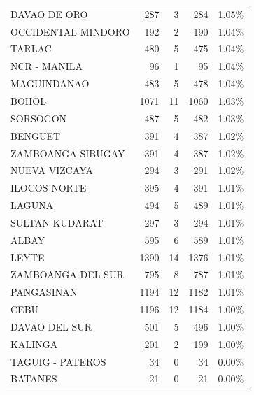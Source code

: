\begin{tabular}{lrrrr}
DAVAO DE ORO & 287 & 3 & 284 & 1.05\% \\
OCCIDENTAL MINDORO & 192 & 2 & 190 & 1.04\% \\
TARLAC & 480 & 5 & 475 & 1.04\% \\
NCR - MANILA & 96 & 1 & 95 & 1.04\% \\
MAGUINDANAO & 483 & 5 & 478 & 1.04\% \\
BOHOL & 1071 & 11 & 1060 & 1.03\% \\
SORSOGON & 487 & 5 & 482 & 1.03\% \\
BENGUET & 391 & 4 & 387 & 1.02\% \\
ZAMBOANGA SIBUGAY & 391 & 4 & 387 & 1.02\% \\
NUEVA VIZCAYA & 294 & 3 & 291 & 1.02\% \\
ILOCOS NORTE & 395 & 4 & 391 & 1.01\% \\
LAGUNA & 494 & 5 & 489 & 1.01\% \\
SULTAN KUDARAT & 297 & 3 & 294 & 1.01\% \\
ALBAY & 595 & 6 & 589 & 1.01\% \\
LEYTE & 1390 & 14 & 1376 & 1.01\% \\
ZAMBOANGA DEL SUR & 795 & 8 & 787 & 1.01\% \\
PANGASINAN & 1194 & 12 & 1182 & 1.01\% \\
CEBU & 1196 & 12 & 1184 & 1.00\% \\
DAVAO DEL SUR & 501 & 5 & 496 & 1.00\% \\
KALINGA & 201 & 2 & 199 & 1.00\% \\
TAGUIG - PATEROS & 34 & 0 & 34 & 0.00\% \\
BATANES & 21 & 0 & 21 & 0.00\% \\
\bottomrule
\end{tabular}
